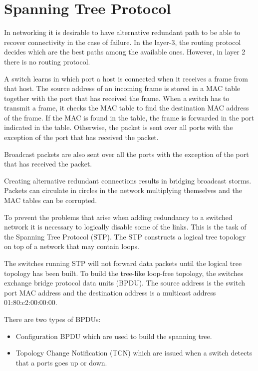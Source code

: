 \section{Spanning Tree Protocol}

In networking it is desirable to have alternative redundant path to be able to recover connectivity in the case of failure.
In the layer-3, the routing protocol decides which are the best paths among the available ones.
However, in layer 2 there is no routing protocol.

A switch learns in which port a host is connected when it receives a frame from that host.
The source address of an incoming frame is stored in a MAC table together with the port that has received the frame.
When a switch has to transmit a frame, it checks the MAC table to find the destination MAC address of the frame.
If the MAC is found in the table, the frame is forwarded in the port indicated in the table.
Otherwise, the packet is sent over all ports with the exception of the port that has received the packet.

Broadcast packets are also sent over all the ports with the exception of the port that has received the packet.

Creating alternative redundant connections results in bridging broadcast storms.
Packets can circulate in circles in the network multiplying themselves and the MAC tables can be corrupted.

To prevent the problems that arise when adding redundancy to a switched network it is necessary to logically disable some of the links.
This is the task of the Spanning Tree Protocol (STP).
The STP constructs a logical tree topology on top of a network that may contain loops.

The switches running STP will not forward data packets until the logical tree topology has been built.
To build the tree-like loop-free topology, the switches exchange bridge protocol data units (BPDU).
The source address is the switch port MAC address and the destination address is a multicast address 01:80:c2:00:00:00.

There are two types of BPDUs:
\begin{itemize}
\item Configuration BPDU which are used to build the spanning tree.
\item Topology Change Notification (TCN) which are issued when a switch detects that a ports goes up or down.
\end{itemize}

